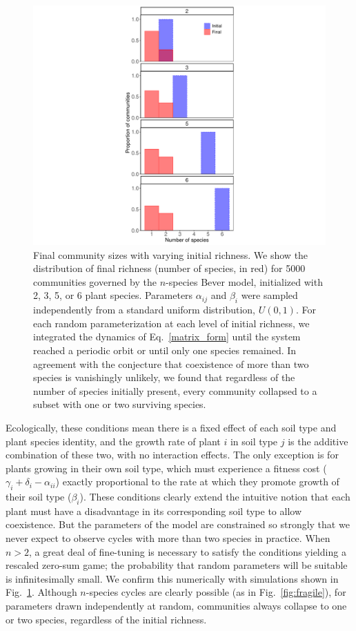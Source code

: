 \documentclass[11pt]{article}
\begin{document}
\begin{figure}
	\centering
	\includegraphics[width=\textwidth]{figure_2.pdf}
	\caption[Final community sizes with varying initial richness]
	{Final community sizes with varying initial richness. We show the distribution of final richness (number of species, in red) for 5000 communities governed by the $n$-species Bever model, initialized with 2, 3, 5, or 6 plant species. Parameters $\alpha_{ij}$ and $\beta_{i}$ were sampled independently from a standard uniform distribution, $U(0,1)$. For each random parameterization at each level of initial richness, we integrated the dynamics of Eq.~\ref{matrix_form} until the system reached a periodic orbit or until only one species remained. In agreement with the conjecture that coexistence of more than two species is vanishingly unlikely, we found that regardless of the number of species initially present, every community collapsed to a subset with one or two surviving species.}
	\label{fig:histograms}
\end{figure}

Ecologically, these conditions mean there is a fixed effect of each soil type and plant species identity, and the growth rate of plant $i$ in soil type $j$ is the additive combination of these two, with no interaction effects. The only exception is for plants growing in their own soil type, which must experience a fitness cost ($\gamma_i + \delta_i - \alpha_{ii}$) exactly proportional to the rate at which they promote growth of their soil type ($\beta_i$). These conditions clearly extend the intuitive notion that each plant must have a disadvantage in its corresponding soil type to allow coexistence. But the parameters of the model are constrained so strongly that we never expect to observe cycles with more than two species in practice. When $n > 2$, a great deal of fine-tuning is necessary to satisfy the conditions yielding a rescaled zero-sum game; the probability that random parameters will be suitable is infinitesimally small. We confirm this numerically with simulations shown in Fig.~\ref{fig:histograms}. Although $n$-species cycles are clearly possible (as in Fig.~\ref{fig:fragile}), for parameters drawn independently at random, communities always collapse to one or two species, regardless of the initial richness. 
\end{document}
